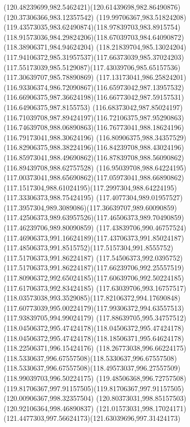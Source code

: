 {    \curveto(120.48239699,982.5462421)(120.61439698,982.86490876)(120.37306366,983.12357542)
    \curveto(119.99706367,983.51824208)(119.43573035,983.62490874)(118.97839703,983.8915754)
    \curveto(118.91573036,984.29824206)(118.67039703,984.64090872)(118.38906371,984.94624204)
    \curveto(118.21839704,985.13024204)(117.94106372,985.31957537)(117.66373039,985.37024203)
    \curveto(117.55173039,985.5129087)(117.43039706,985.65157536)(117.30639707,985.78890869)
    \curveto(117.13173041,986.25824201)(116.93306374,986.72090867)(116.65973042,987.13957532)
    \curveto(116.66906375,987.36624198)(116.66773042,987.59157531)(116.64906375,987.8155753)
    \curveto(116.68373042,987.85024197)(116.71039708,987.89424197)(116.72106375,987.95290863)
    \curveto(116.74639708,988.06890863)(116.76773041,988.18624196)(116.79173041,988.30624196)
    \curveto(116.80906375,988.34357529)(116.82906375,988.38224196)(116.84239708,988.43024196)
    \curveto(116.85973041,988.49690862)(116.87839708,988.56090862)(116.89439708,988.62757528)
    \curveto(116.95039708,988.64224195)(117.00373041,988.65690862)(117.05973041,988.66890862)
    \curveto(117.1517304,988.61024195)(117.2997304,988.64224195)(117.33306373,988.75424195)
    \curveto(117.4077304,989.01957527)(117.3957304,989.3089086)(117.36639707,989.60090859)
    \curveto(117.42506373,989.63957526)(117.46506373,989.70490859)(117.46239706,989.80090859)
    \curveto(117.43839706,990.46757524)(117.46906373,991.16624189)(117.43706373,991.85024187)
    \curveto(117.48506373,991.8515752)(117.5157304,991.8555752)(117.51706373,991.86224187)
    \curveto(117.54506373,992.0395752)(117.51706373,991.86224187)(117.66239706,992.25557519)
    \curveto(117.80906372,992.65024185)(117.60639706,992.50224185)(117.61706373,992.83424185)
    \curveto(117.63039706,993.16757517)(118.03573038,993.3529085)(117.82106372,994.17690848)
    \curveto(117.60773039,995.00224179)(117.99306372,994.63557513)(117.93839705,994.99024179)
    \curveto(117.88639705,995.34757512)(118.04506372,995.47424178)(118.04506372,995.47424178)
    \curveto(118.04506372,995.47424178)(118.18506371,995.64624178)(118.22506371,996.15424176)
    \curveto(118.26773038,996.66224175)(118.5330637,996.67557508)(118.5330637,996.67557508)
    \curveto(118.5330637,996.67557508)(118.49573037,996.27557509)(118.99039703,996.50224175)
    \curveto(119.48506368,996.72757508)(119.81706367,997.91157505)(119.81706367,997.91157505)
    \lineto(120.00906367,998.32357504)
    \lineto(120.80373031,998.85157503)
    \lineto(120.92106364,998.46890837)
    \curveto(121.01573031,998.17024171)(121.4477303,997.56624173)(121.63039696,997.31424173)
}
